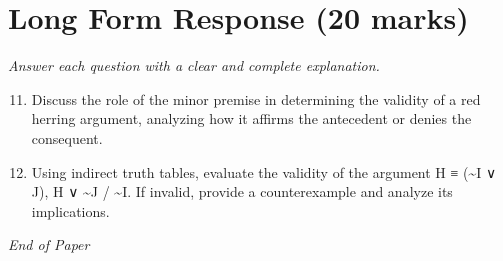\documentclass[12pt]{article}
\begin{document}
\section*{Long Form Response (20 marks)}
\textit{Answer each question with a clear and complete explanation.}
\begin{enumerate}[label=\arabic*.]
\setcounter{enumi}{10}
\item Discuss the role of the minor premise in determining the validity of a red herring argument, analyzing how it affirms the antecedent or denies the consequent.
\item Using indirect truth tables, evaluate the validity of the argument H ≡ (\textasciitilde{}I ∨ J), H ∨ \textasciitilde{}J / \textasciitilde{}I. If invalid, provide a counterexample and analyze its implications.
\end{enumerate}

\vfill
\noindent\textit{End of Paper}
\end{document}
